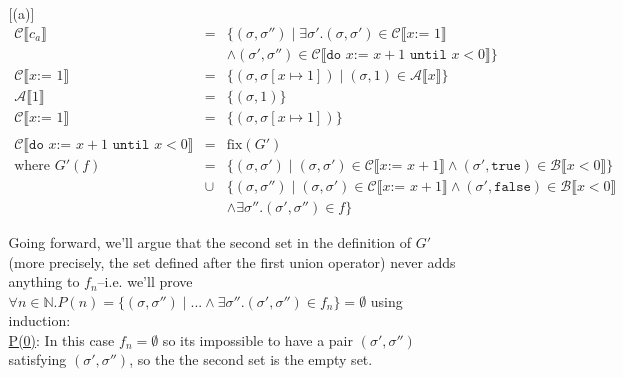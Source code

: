 \documentclass[10pt, oneside]{article}
\begin{document}
\begin{enumerate}[1.]
\begin{enumerate} [(a)]
      \begin{eqnarray*}
        \mathcal{C} \llbracket c_a \rrbracket & = & 
          \{(\sigma, \sigma'') \mid \exists \sigma'. 
            (\sigma, \sigma') \in \mathcal{C}\llbracket x\texttt{:= } 1\rrbracket \\
     & & \wedge (\sigma', \sigma'') \in \mathcal{C} \llbracket \texttt{do } x 
                               \texttt{:= } x + 1 \texttt{ until } x < 0 \rrbracket
                                   \} \\
        \mathcal{C} \llbracket x \texttt{:= }1 \rrbracket & = & \{ (\sigma, \sigma[x \mapsto 1]) \mid (\sigma, 1) \in \mathcal{A} \llbracket x \rrbracket  \} \\
        \mathcal{A} \llbracket 1 \rrbracket & = & \{(\sigma, 1) \} \\
        \mathcal{C} \llbracket x \texttt{:= } 1 \rrbracket & = & \{ (\sigma, \sigma[x \mapsto 1]) \} \\
        & & \\
        \mathcal{C} \llbracket \texttt{do } x \texttt{:= } x + 1 \texttt{ until } x < 0 \rrbracket & = & \text{fix}(G') \\
        \text{where } G'(f) & = & \{ (\sigma, \sigma') \mid (\sigma, \sigma') \in \mathcal{C} \llbracket x \texttt{:= } x + 1 \rrbracket \wedge (\sigma', \texttt{true}) \in \mathcal{B} \llbracket x < 0 \rrbracket \} \\
				& \cup & \{ (\sigma, \sigma'') \mid (\sigma, \sigma')  \in \mathcal{C} \llbracket x \texttt{:= } x + 1 \rrbracket \wedge (\sigma', \texttt{false})\in \mathcal{B} \llbracket x < 0 \rrbracket \\
				& & \wedge \exists \sigma''. (\sigma', \sigma'') \in f \}
      \end{eqnarray*}
      
      Going forward, we'll argue that the second set in the definition of $G'$ 
      (more precisely, the set defined after the first union operator) never adds 
      anything to $f_n$--i.e. we'll prove $\forall n \in \mathbb{N}. 
      P(n) = \{ (\sigma, \sigma'') \mid ... \wedge \exists \sigma''. (\sigma', 
      \sigma'') \in f_n \} = \emptyset$ using induction: \\
      
      \underline{P(0)}: In this case $f_n = \emptyset$ so its impossible to have
      a pair $(\sigma', \sigma'')$ satisfying $(\sigma', \sigma'')$, so the the 
      second set is the empty set. \\
      

\end{enumerate}
\end{enumerate}
\end{document}
